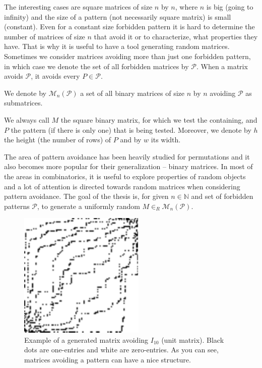 The interesting cases are square matrices of size $n$ by $n$, where $n$ is big (going to infinity) and the size of a pattern (not necessarily square matrix) is small (constant). Even for a constant size forbidden pattern it is hard to determine the number of matrices of size $n$ that avoid it or to characterize, what properties they have. That is why it is useful to have a tool generating random matrices. Sometimes we consider matrices avoiding more than just one forbidden pattern, in which case we denote the set of all forbidden matrices by $\mathcal{P}$. When a matrix avoids $\mathcal{P}$, it avoids every $P\in\mathcal{P}$. 
\begin{ntn}
We denote by $\mathcal{M}_n(\mathcal{P})$ a set of all binary matrices of size $n$ by $n$ avoiding $\mathcal{P}$ as submatrices.
\end{ntn}
\begin{ntn}
We always call $M$ the square binary matrix, for which we test the containing, and $P$ the pattern (if there is only one) that is being tested. Moreover, we denote by $h$ the height (the number of rows) of $P$ and by $w$ its width.
\end{ntn}
The area of pattern avoidance has been heavily studied for permutations and it also becomes more popular for their generalization -- binary matrices. In most of the areas in combinatorics, it is useful to explore properties of random objects and a lot of attention is directed towards random matrices when considering pattern avoidance. The goal of the thesis is, for given $n\in\mathbb{N}$ and set of forbidden patterns $\mathcal{P}$, to generate a uniformly random $M\in_R\mathcal{M}_n(\mathcal{P})$.
\begin{figure}[h!]
\centering
\includegraphics[width=60mm]{../img/walking-diag.pdf}
\caption{Example of a generated matrix avoiding $I_{10}$ (unit matrix). Black dots are one-entries and white are zero-entries. As you can see, matrices avoiding a pattern can have a nice structure.}
\label{avoiding}
\end{figure}
